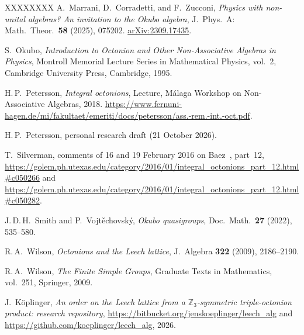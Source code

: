 \documentclass[twoside,english]{paper}
\numberwithin{equation}{section}
\numberwithin{figure}{section}
\theoremstyle{definition}
\theoremstyle{remark}
\newcommand{\ZZ}{\mathbb{Z}}
\begin{document}
\begin{thebibliography}{XXXXXXXX}
A.~Marrani, D.~Corradetti, and F.~Zucconi,
\emph{Physics with non-unital algebras? An invitation to the Okubo
algebra},
J.\ Phys.\ A: Math.\ Theor.\ \textbf{58} (2025), 075202.
\href{https://arxiv.org/abs/2309.17435}{arXiv:2309.17435}.

S.~Okubo,
\emph{Introduction to Octonion and Other Non-Associative Algebras in
Physics},
Montroll Memorial Lecture Series in Mathematical Physics, vol.~2,
Cambridge University Press, Cambridge, 1995.

H.\,P.~Petersson,
\emph{Integral octonions},
Lecture, M\'alaga Workshop on Non-Associative Algebras, 2018.
\url{https://www.fernuni-hagen.de/mi/fakultaet/emeriti/docs/petersson/ass.-rem.-int.-oct.pdf}.

H.\,P.~Petersson,
personal research draft (21 October 2026).

T.~Silverman,
comments of 16 and 19 February 2016 on Baez~\cite{Baez2014}, part~12,
\url{https://golem.ph.utexas.edu/category/2016/01/integral_octonions_part_12.html#c050266}
and
\url{https://golem.ph.utexas.edu/category/2016/01/integral_octonions_part_12.html#c050282}.

J.\,D.\,H.~Smith and P.~Vojt\v{e}chovsk\'y,
\emph{Okubo quasigroups},
Doc.\ Math.\ \textbf{27} (2022), 535--580.

R.\,A.~Wilson,
\emph{Octonions and the Leech lattice},
J.~Algebra \textbf{322} (2009), 2186--2190.

R.\,A.~Wilson,
\emph{The Finite Simple Groups},
Graduate Texts in Mathematics, vol.~251, Springer, 2009.

J.~K\"oplinger,
\emph{An order on the Leech lattice from a $\ZZ_3$-symmetric
triple-octonion product: research repository},
\url{https://bitbucket.org/jenskoeplinger/leech_alg} and
\url{https://github.com/koeplinger/leech_alg}, 2026.

\end{thebibliography}
\end{document}
